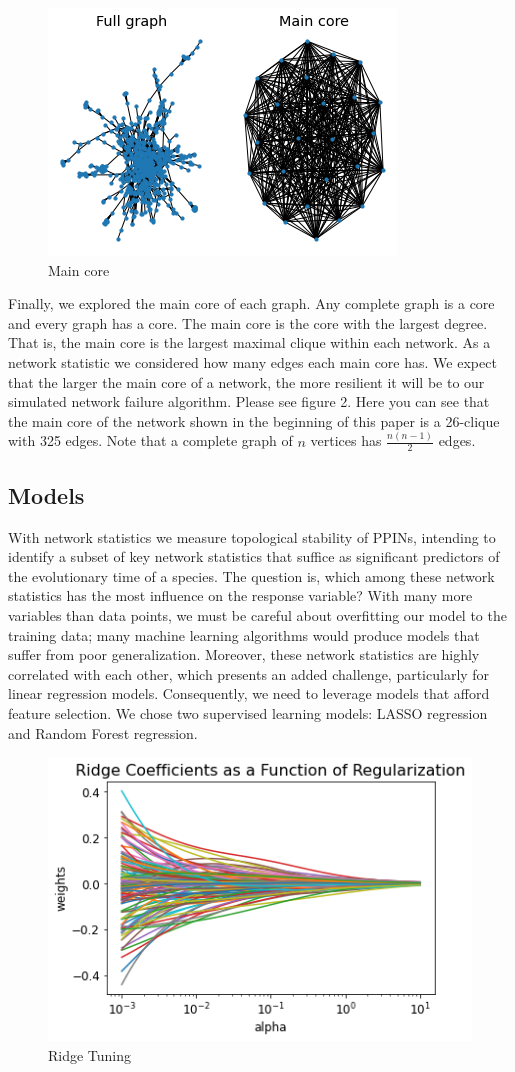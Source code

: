 \documentclass[12pt]{article}
\begin{document}
\begin{figure}
\centering
  \includegraphics[width=.4\linewidth]{PPIN_fig7}
  \caption{Main core}
  \label{fig:PPIN_fig7}
\end{figure}

Finally, we explored the main core of each graph. Any complete graph is a core and every graph has a core. The main core is the core with the largest degree. That is, the main core is the largest maximal clique within each network. As a network statistic we considered how many edges each main core has. We expect that the larger the main core of a network, the more resilient it will be to our simulated network failure algorithm. Please see figure 2. Here you can see that the main core of the network shown in the beginning of this paper is a 26-clique with 325 edges. Note that a complete graph of $n$ vertices has $\tfrac{n(n-1)}{2}$ edges.

\subsection{Models}
With network statistics we measure topological stability of PPINs, intending to identify a subset of key network statistics that suffice as significant predictors of the evolutionary time of a species. The question is, which among these network statistics has the most influence on the response variable? With many more variables than data points, we must be careful about overfitting our model to the training data; many machine learning algorithms would produce models that suffer from poor generalization. Moreover, these network statistics are highly correlated with each other, which presents an added challenge, particularly for linear regression models. Consequently, we need to leverage models that afford feature selection. We chose two supervised learning models: LASSO regression and Random Forest regression.

\begin{figure}
\centering
  \includegraphics[width=.4\linewidth]{PPIN_fig4}
  \caption{Ridge Tuning}
  \label{fig:PPIN_fig4}
\end{figure}
\end{document}
